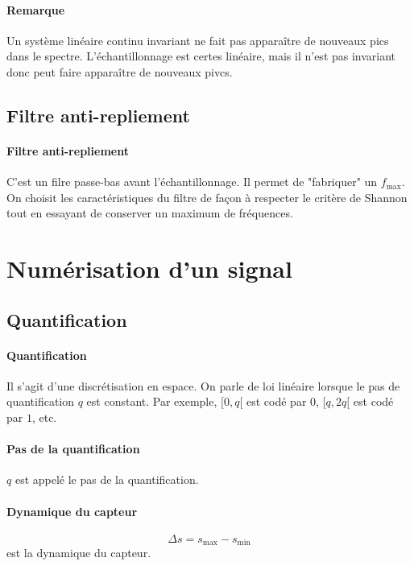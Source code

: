 \documentclass[french]{book}
\theoremstyle{plain}
\theoremstyle{definition}
\theoremstyle{remark}
\begin{document}
\paragraph{Remarque} Un système linéaire continu invariant ne fait pas apparaître de nouveaux pics dans le spectre. L'échantillonnage est certes linéaire, mais il n'est pas invariant donc peut faire apparaître de nouveaux pivcs.

\subsection{Filtre anti-repliement}

\paragraph{Filtre anti-repliement} C'est un filre passe-bas avant l'échantillonnage. Il permet de "fabriquer" un $f_{\text{max}}$. On choisit les caractéristiques du filtre de façon à respecter le critère de Shannon tout en essayant de conserver un maximum de fréquences.

\section{Numérisation d'un signal}

\subsection{Quantification}

\paragraph{Quantification} Il s'agit d'une discrétisation en espace. On parle de loi linéaire lorsque le pas de quantification $q$ est constant. Par exemple, $[0,q[$ est codé par $0$, $[q,2q[$ est codé par $1$, etc.

\paragraph{Pas de la quantification} $q$ est appelé le pas de la quantification.

\paragraph{Dynamique du capteur} $$\Delta s = s_\text{max} - s_\text{min}$$ est la dynamique du capteur.
\end{document}
